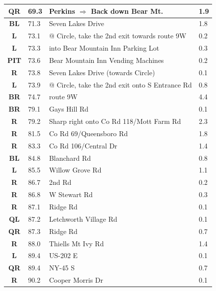 \documentclass[11pt]{article}
\begin{document}
\begin{center}
\begin{supertabular}{|c|p{0.30in}|p{2.25in}|l|}
 \textbf{QR} &  69.3 & Perkins $\Rightarrow$ Back down Bear Mt. &   1.9 \\ \hline
 \textbf{BL} &  71.3 & Seven Lakes Drive &   1.8 \\ \hline
 \textbf{L} &  73.1 & @ Circle, take the 2nd exit towards route 9W &   0.2 \\ \hline
 \textbf{L} &  73.3 & into Bear Mountain Inn Parking Lot &   0.3 \\ \hline
{} \textbf{PIT} &  73.6 & Bear Mountain Inn Vending Machines &   0.2 \\ \hline
{} \textbf{R} &  73.8 & Seven Lakes Drive (towards Circle) &   0.1 \\ \hline
 \textbf{L} &  73.9 & @ Circle, take the 2nd exit onto S Entrance Rd &   0.8 \\ \hline
{} \textbf{BR} &  74.7 & route 9W &   4.4 \\ \hline
{} \textbf{BR} &  79.1 & Gays Hill Rd &   0.1 \\ \hline
{} \textbf{R} &  79.2 & Sharp right onto Co Rd 118/Mott Farm Rd &   2.3 \\ \hline
{} \textbf{R} &  81.5 & Co Rd 69/Queensboro Rd &   1.8 \\ \hline
{} \textbf{R} &  83.3 & Co Rd 106/Central Dr &   1.4 \\ \hline
 \textbf{BL} &  84.8 & Blanchard Rd &   0.8 \\ \hline
 \textbf{L} &  85.5 & Willow Grove Rd &   1.1 \\ \hline
{} \textbf{R} &  86.7 & 2nd Rd &   0.2 \\ \hline
{} \textbf{R} &  86.8 & W Stewart Rd &   0.3 \\ \hline
{} \textbf{R} &  87.1 & Ridge Rd &   0.1 \\ \hline
 \textbf{QL} &  87.2 & Letchworth Village Rd &   0.1 \\ \hline
{} \textbf{QR} &  87.3 & Ridge Rd &   0.7 \\ \hline
{} \textbf{R} &  88.0 & Thiells Mt Ivy Rd &   1.4 \\ \hline
 \textbf{L} &  89.4 & US-202 E &   0.1 \\ \hline
{} \textbf{QR} &  89.4 & NY-45 S &   0.7 \\ \hline
{} \textbf{R} &  90.2 & Cooper Morris Dr &   0.1 \\ \hline

\end{supertabular}
\end{center}
\end{document}
